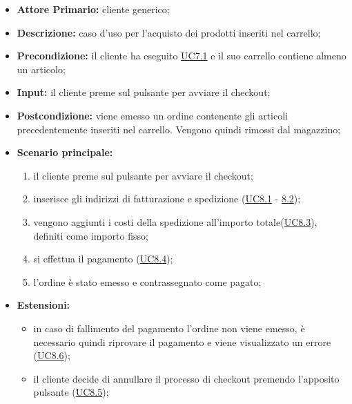 \begin{itemize}
    \item \textbf{Attore Primario:} cliente generico;
    \item \textbf{Descrizione:} caso d'uso per l'acquisto dei prodotti inseriti nel carrello;
    \item \textbf{Precondizione:} il cliente ha eseguito \hyperref[UC7.1]{UC7.1} e il suo carrello contiene almeno un articolo;
    \item \textbf{Input:} il cliente preme sul pulsante per avviare il checkout;
    \item \textbf{Postcondizione:} viene emesso un ordine contenente gli articoli precedentemente inseriti nel carrello. Vengono quindi rimossi dal magazzino;
    \item \textbf{Scenario principale:}
          \begin{enumerate}
              \item il cliente preme sul pulsante per avviare il checkout;
              \item inserisce gli indirizzi di fatturazione e spedizione (\hyperref[UC8.1]{UC8.1} - \hyperref[UC8.2]{8.2});
              \item vengono aggiunti i costi della spedizione all'importo totale(\hyperref[UC8.3]{UC8.3}), definiti come importo fisso;
              \item si effettua il pagamento (\hyperref[UC8.4]{UC8.4});
              \item l'ordine è stato emesso e contrassegnato come pagato;
          \end{enumerate}
    \item \textbf{Estensioni:}
          \begin{itemize}
              \item in caso di fallimento del pagamento l'ordine non viene emesso, è necessario quindi riprovare il pagamento e viene visualizzato un errore (\hyperref[UC8.6]{UC8.6});
              \item il cliente decide di annullare il processo di checkout premendo l'apposito pulsante (\hyperref[UC8.5]{UC8.5});
          \end{itemize}
\end{itemize}

\stepsubUserCase
